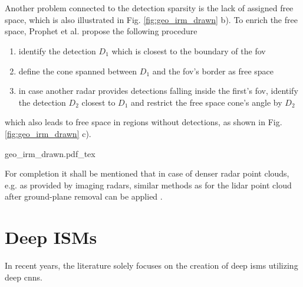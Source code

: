 \\\\
Another problem connected to the detection sparsity is the lack of assigned free space, which is also illustrated in Fig. \ref{fig:geo_irm_drawn} b). To enrich the free space, Prophet et al. \cite{prophet2018adaptions} propose the following procedure
\begin{enumerate}
	\item identify the detection $D_1$ which is closest to the boundary of the \gls{fov}
	\item define the cone spanned between $D_1$ and the \gls{fov}'s border as free space
	\item in case another radar provides detections falling inside the first's \gls{fov}, identify the detection $D_2$ closest to $D_1$ and restrict the free space cone's angle by $D_2$   
\end{enumerate}
which also leads to free space in regions without detections, as shown in Fig. \ref{fig:geo_irm_drawn} c).
\begin{center}
	{geo_irm_drawn.pdf_tex}
\end{center}
For completion it shall be mentioned that in case of denser radar point clouds, e.g. as provided by imaging radars, similar methods as for the lidar point cloud after ground-plane removal can be applied \cite{slutsky2019dual}.
%
\section{Deep ISMs}
\label{sec:deep_isms}
In recent years, the literature solely focuses on the creation of deep \gls{ism}s utilizing deep \gls{cnn}s. 
%
